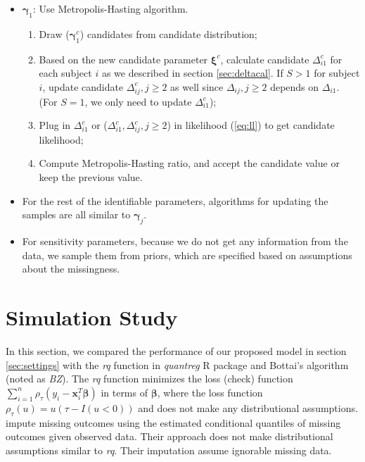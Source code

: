 \documentclass[12pt]{article}
\begin{document}
\begin{itemize}
\item $\bm \gamma_{1} $: Use Metropolis-Hasting algorithm.
  \begin{enumerate}
  \item Draw ($\bm \gamma_{1}^c$) candidates from candidate
    distribution;
  \item Based on the new candidate parameter $\bm \xi^c$, calculate
    candidate $\Delta_{i1}^c$ for each subject $i$ as we described in
    section \ref{sec:deltacal}. If $S > 1$ for subject $i$, update
    candidate $\Delta_{ij}^c, j \geq 2$ as well since $\Delta_{ij}, j
    \geq 2$ depends on $\Delta_{i1}$. (For $S = 1$, we only need to
    update $\Delta_{i1}^c$);
  \item Plug in $\Delta_{i1}^c$ or ($\Delta_{i1}^c, \Delta_{ij}^c, j
    \geq 2$) in likelihood (\ref{eq:ll}) to get candidate likelihood;
  \item Compute Metropolis-Hasting ratio, and accept the candidate
    value or keep the previous value.
  \end{enumerate}
\item For the rest of the identifiable parameters, algorithms for
  updating the samples are all similar to $\bm \gamma_j$.
\item For sensitivity parameters, because we do not get any
  information from the data, we sample them from priors, which are
  specified based on assumptions about the missingness.
\end{itemize}

\section{Simulation Study}
\label{sec:simulation}
In this section, we compared the performance of our proposed model in
section \ref{sec:settings} with the \textit{rq} function in
\textit{quantreg} R package \citep{quantreg} and Bottai's algorithm
\citep{bottai2013} (noted as \textit{BZ}). The \textit{rq} function
minimizes the loss (check) function $\sum_{i=1}^n \rho_{\tau} (y_i -
\bm x_i^T \bm \beta)$ in terms of $\bm \beta$, where the loss function
$\rho_{\tau} (u) = u(\tau - I(u < 0))$ and does not make any
distributional assumptions. \citet{bottai2013} impute missing outcomes
using the estimated conditional quantiles of missing outcomes given
observed data. Their approach does not make distributional assumptions
similar to \textit{rq}.  Their imputation assume ignorable missing
data.
\end{document}
